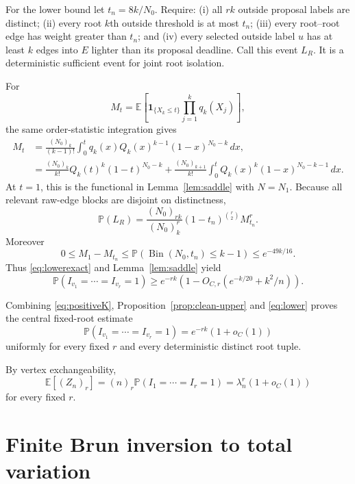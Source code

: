 \documentclass[11pt]{article}
\newcommand{\Pp}{\mathbb P}
\newcommand{\Ee}{\mathbb E}
\newcommand{\1}{\mathbf 1}
\newcommand{\Bin}{\operatorname{Bin}}
\begin{document}
For the lower bound let $t_n=8k/N_0$.  Require: (i) all $rk$ outside proposal labels are
distinct; (ii) every root $k$th outside threshold is at most $t_n$; (iii) every root--root
edge has weight greater than $t_n$; and (iv) every selected outside label $u$ has at least
$k$ edges into $E$ lighter than its proposal deadline.  Call this event $L_R$.  It is a
deterministic sufficient event for joint root isolation.

For
\[
 M_t=\Ee\left[\1_{\{X_k\le t\}}\prod_{j=1}^kq_k(X_j)\right],
\]
the same order-statistic integration gives
\begin{align}
 M_t&=\frac{(N_0)_k}{(k-1)!}\int_0^t
 q_k(x)Q_k(x)^{k-1}(1-x)^{N_0-k}\,dx,\label{eq:Mt1}\\
 &=\frac{(N_0)_k}{k!}Q_k(t)^k(1-t)^{N_0-k}
 +\frac{(N_0)_{k+1}}{k!}\int_0^tQ_k(x)^k(1-x)^{N_0-k-1}\,dx.\label{eq:Mt2}
\end{align}
At $t=1$, this is the functional in Lemma~\ref{lem:saddle} with $N=N_1$.
Because all relevant raw-edge blocks are disjoint on distinctness,
\begin{equation}\label{eq:lowerexact}
 \Pp(L_R)=\frac{(N_0)_{rk}}{(N_0)_k^r}
 (1-t_n)^{\binom r2}M_{t_n}^r.
\end{equation}
Moreover
\[
 0\le M_1-M_{t_n}\le\Pp(\Bin(N_0,t_n)\le k-1)\le e^{-49k/16}.
\]
Thus \eqref{eq:lowerexact} and Lemma~\ref{lem:saddle} yield
\begin{equation}\label{eq:lower}
 \Pp(I_{v_1}=\cdots=I_{v_r}=1)
 \ge e^{-rk}\left(1-O_{C,r}(e^{-k/20}+k^2/n)\right).
\end{equation}

Combining \eqref{eq:positiveK}, Proposition~\ref{prop:clean-upper} and
\eqref{eq:lower} proves the central fixed-root estimate
\begin{equation}\label{eq:joint}
 \boxed{\Pp(I_{v_1}=\cdots=I_{v_r}=1)=e^{-rk}(1+o_C(1))}
\end{equation}
uniformly for every fixed $r$ and every deterministic distinct root tuple.

By vertex exchangeability,
\begin{equation}\label{eq:factmom}
 \Ee[(Z_n)_r]=(n)_r\Pp(I_1=\cdots=I_r=1)
 =\lambda_n^r(1+o_C(1))
\end{equation}
for every fixed $r$.

\section{Finite Brun inversion to total variation}
\end{document}
